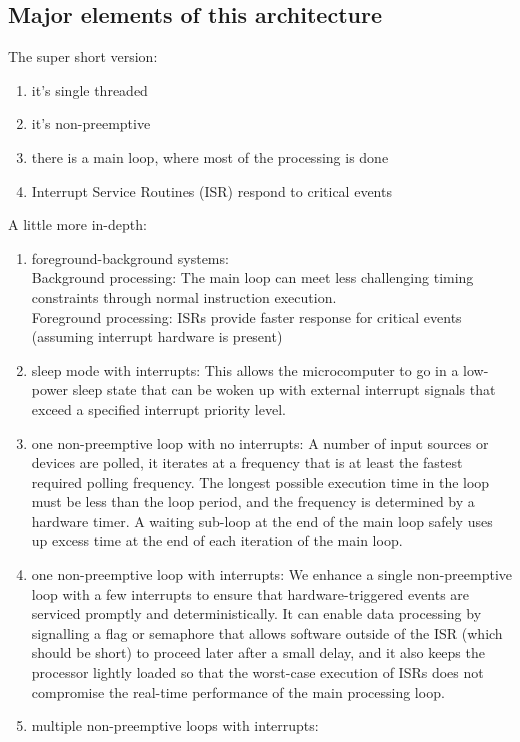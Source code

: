 \subsection{Major elements of this architecture}
The super short version:
\begin{enumerate}
  \item it's single threaded
  \item it's non-preemptive
  \item there is a main loop, where most of the processing is done
  \item Interrupt Service Routines (ISR) respond to critical events
\end{enumerate}

\noindent
A little more in-depth:
\begin{enumerate}
  \item foreground-background systems:\\
    Background processing: The main loop can meet less challenging timing
    constraints through normal instruction execution.\\ 
    Foreground processing: ISRs provide faster
    response for critical events (assuming interrupt hardware is present)
  \item sleep mode with interrupts: This allows the microcomputer to go in a
    low-power sleep state that can be woken up with external interrupt signals that exceed a specified interrupt priority level.
  \item one non-preemptive loop with no interrupts:
    A number of input sources or devices are polled, it iterates at a frequency
    that is at least the fastest required polling frequency. The longest
    possible execution time in the loop must be less than the loop period,
    and the frequency is determined by a hardware timer. 
    A waiting sub-loop at the end of the main loop safely uses
    up excess time at the end of each iteration of the main loop.
  \item one non-preemptive loop with interrupts:
    We enhance a single non-preemptive loop with a few interrupts to ensure that
    hardware-triggered events are serviced promptly and deterministically.  It
    can enable data processing by signalling a flag or semaphore that allows
    software outside of the ISR (which should be short) to proceed later after a
    small delay, and it also keeps the processor lightly loaded so that the
    worst-case execution of ISRs does not compromise the real-time performance
    of the main processing loop.
  \item multiple non-preemptive loops with interrupts:

\end{enumerate}
